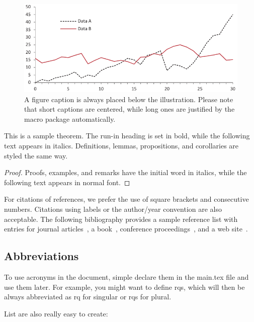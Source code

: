 \begin{figure}
\includegraphics[width=\textwidth]{figures/fig1}
\caption{A figure caption is always placed below the illustration.
Please note that short captions are centered, while long ones are justified by the macro package automatically.} 
\label{fig1}
\end{figure}

\begin{theorem}
This is a sample theorem. 
The run-in heading is set in bold, while the following text appears in italics. 
Definitions, lemmas, propositions, and corollaries are styled the same way.
\end{theorem}
%
%
\begin{proof}
Proofs, examples, and remarks have the initial word in italics, while the following text appears in normal font.
\end{proof}
For citations of references, we prefer the use of square brackets and consecutive numbers. 
Citations using labels or the author/year convention are also acceptable. 
The following bibliography provides a sample reference list with entries for journal articles~\cite{Stol2016}, a book~\cite{Myers2012}, conference proceedings~\cite{Harrold1988}, and a web site~\cite{Schaffer2018}.

\subsection{Abbreviations}
\label{sec:intro:sub:abbrev}

To use acronyms in the document, simple declare them in the main.tex file and use them later.
For example, you might want to define \acp{rq}, which will then be always abbreviated as \ac{rq} for singular or \acp{rq} for plural.

List are also really easy to create:

